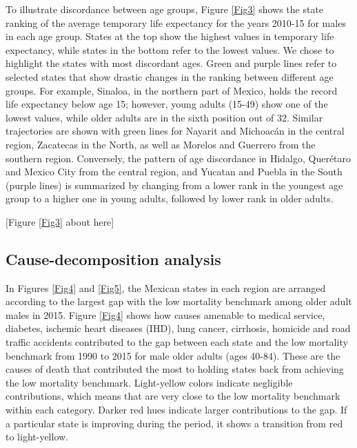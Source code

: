 \documentclass{bmcart}
\begin{document}
To illustrate discordance between age groups, Figure \ref{Fig3} shows the state ranking of the average temporary life expectancy for the years 2010-15 for males in each age group. States at the top show the highest values in temporary life expectancy, while states in the bottom refer to the lowest values. We chose to highlight the states with most discordant ages. Green and purple lines refer to selected states that show drastic changes in the ranking between different age groups. For example, Sinaloa, in the northern part of Mexico, holds the record life expectancy below age 15; however, young adults (15-49) show one of the lowest values, while older adults are in the sixth position out of 32. Similar trajectories are shown with green lines for Nayarit and Michoac\'an in the central region, Zacatecas in the North, as well as Morelos and Guerrero from the southern region. Conversely, the pattern of age discordance in Hidalgo, Quer\'etaro and Mexico City from the central region, and Yucatan and Puebla in the South (purple lines) is summarized by changing from a lower rank in the youngest age group to a higher one in young adults, followed by lower rank in older adults. \\

\begin{center}
[Figure \ref{Fig3} about here]
\end{center}


\subsection*{Cause-decomposition analysis}


In Figures \ref{Fig4} and \ref{Fig5}, the Mexican states in each region are arranged according to the largest gap with the low mortality benchmark among older adult males in 2015. Figure \ref{Fig4} shows how causes amenable to medical service, diabetes, ischemic heart diseases (IHD), lung cancer, cirrhosis, homicide and road traffic accidents contributed to the gap between each state and the low mortality benchmark from 1990 to 2015 for male older adults (ages 40-84). These are the causes of death that contributed the most to holding states back from achieving the low mortality benchmark. Light-yellow colors indicate negligible contributions, which means that are very close to the low mortality benchmark within each category. Darker red hues indicate larger contributions to the gap. If a particular state is improving during the period, it shows a transition from red to light-yellow. 
\end{document}
